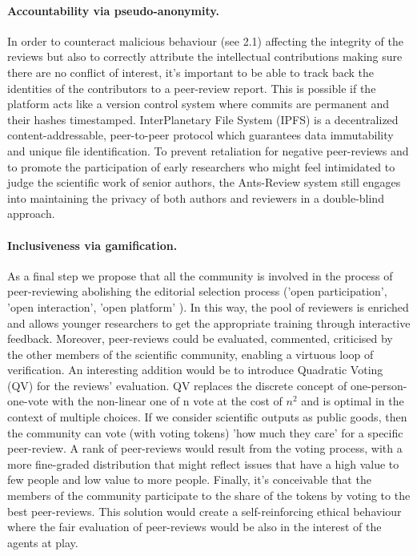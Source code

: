 \documentclass[runningheads]{llncs}
\begin{document}
\paragraph{Accountability via pseudo-anonymity.} In order to counteract malicious behaviour (see 2.1) affecting the integrity of the reviews but also to correctly attribute the intellectual contributions making sure there are no conflict of interest, it's important to be able to track back the identities of the contributors to a peer-review report. This is possible if the platform acts like a version control system where commits are permanent and their hashes timestamped. InterPlanetary File System (IPFS) \cite{IPFS} is a decentralized content-addressable, peer-to-peer protocol which guarantees data immutability and unique file identification.
\newline To prevent retaliation for negative peer-reviews and to promote the participation of early researchers who might feel intimidated to judge the scientific work of senior authors, the Ants-Review system still engages into maintaining the privacy of both authors and reviewers in a double-blind approach.

\paragraph{Inclusiveness via gamification.} As a final step we propose that all the community is involved in the process of peer-reviewing abolishing the editorial selection process ('open participation', 'open interaction', 'open platform' \cite{OPR-Ross-Hellauer}). In this way, the pool of reviewers is enriched and allows younger researchers to get the appropriate training through interactive feedback. Moreover, peer-reviews could be evaluated, commented, criticised by the other members of the scientific community, enabling a virtuous loop of verification. \newline An interesting addition would be to introduce Quadratic Voting (QV) \cite{QVWeyl} for the reviews' evaluation. QV replaces the discrete concept of one-person-one-vote with the non-linear one of n vote at the cost of $n^2$ and is optimal in the context of multiple choices. If we consider scientific outputs as public goods, then the community can vote (with voting tokens) 'how much they care' for a specific peer-review. A rank of peer-reviews would result from the voting process, with a more fine-graded distribution that might reflect issues that have a high value to few people and low value to more people. \newline Finally, it's conceivable that the members of the community participate to the share of the tokens by voting to the best peer-reviews. This solution would create a self-reinforcing ethical behaviour where the fair evaluation of peer-reviews would be also in the interest of the agents at play.
\end{document}
